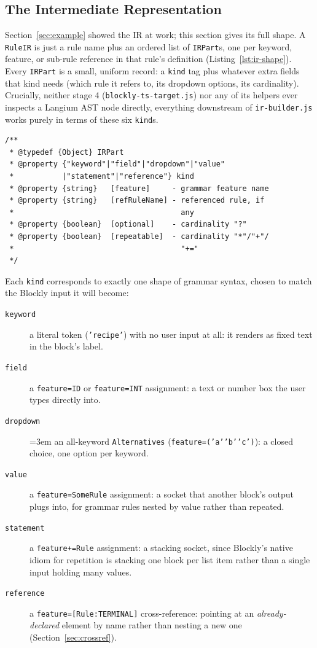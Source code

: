 \documentclass[runningheads]{llncs}
\begin{document}
\subsection{The Intermediate Representation}
\label{sec:ir}
Section~\ref{sec:example} showed the IR at work; this section gives its full shape. A \texttt{RuleIR} is just a rule name plus an ordered list of \texttt{IRPart}s, one per keyword, feature, or sub-rule reference in that rule's definition (Listing~\ref{lst:ir-shape}). Every \texttt{IRPart} is a small, uniform record: a \texttt{kind} tag plus whatever extra fields that kind needs (which rule it refers to, its dropdown options, its cardinality). Crucially, neither stage 4 (\texttt{blockly-ts-target.js}) nor any of its helpers ever inspects a Langium AST node directly, everything downstream of \texttt{ir-builder.js} works purely in terms of these six \texttt{kind}s.

\begin{lstlisting}[caption={The \texttt{IRPart} shape (JSDoc typedef, abbreviated)}, label=lst:ir-shape]
/**
 * @typedef {Object} IRPart
 * @property {"keyword"|"field"|"dropdown"|"value"
 *           |"statement"|"reference"} kind
 * @property {string}   [feature]     - grammar feature name
 * @property {string}   [refRuleName] - referenced rule, if 
 *                                      any
 * @property {boolean}  [optional]    - cardinality "?"
 * @property {boolean}  [repeatable]  - cardinality "*"/"+"/
 *                                      "+="
 */
\end{lstlisting}

Each \texttt{kind} corresponds to exactly one shape of grammar syntax, chosen to match the Blockly input it will become:
\begin{description}
\item[\texttt{keyword}] a literal token (\texttt{'recipe'}) with no user input at all: it renders as fixed text in the block's label.
\item[\texttt{field}] a \texttt{feature=ID} or \texttt{feature=INT} assignment: a text or number box the user types directly into.
\item[\texttt{dropdown}] {\emergencystretch=3em an all-keyword \texttt{Alternatives} (\texttt{feature=('a'\textbar 'b'\textbar 'c')}): a closed choice, one option per keyword. \par}
\item[\texttt{value}] a \texttt{feature=SomeRule} assignment: a socket that another block's output plugs into, for grammar rules nested by value rather than repeated.
\item[\texttt{statement}] a \texttt{feature+=Rule} assignment: a stacking socket, since Blockly's native idiom for repetition is stacking one block per list item rather than a single input holding many values.
\item[\texttt{reference}] a \texttt{feature=[Rule:TERMINAL]} cross-reference: pointing at an \emph{already-declared} element by name rather than nesting a new one (Section~\ref{sec:crossref}).
\end{description}
\end{document}
